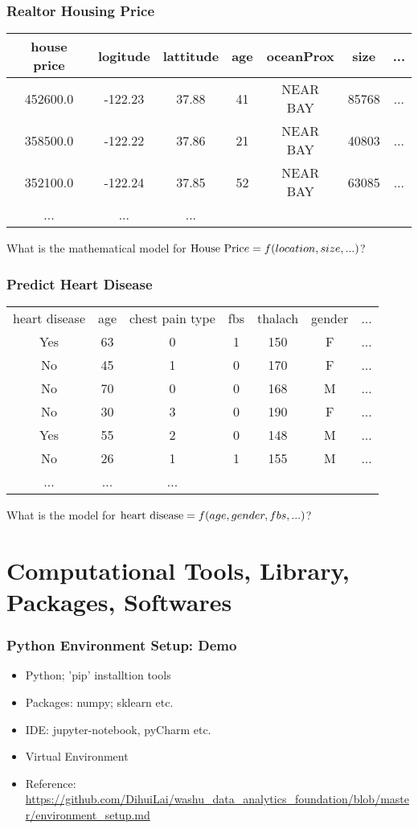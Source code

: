 \documentclass[notheorems, aspectratio=54]{beamer}
\begin{document}
\begin{frame}
\frametitle{Realtor Housing Price}
\begin{table}[]
\begin{tabular} { c c c c c c c}
house price &logitude & lattitude & age  &oceanProx &size &...\\ 
\hline
452600.0 &-122.23	&37.88	&41 	&NEAR BAY &85768 &...\\
358500.0 &-122.22	&37.86	&21		&NEAR BAY &40803 & ...\\
352100.0 &-122.24	&37.85	&52 	&NEAR BAY &63085 & ...\\
... & ... & ... & & & &
\end{tabular}
\end{table}

What is the mathematical model for $\text{House Pric}e=\mathnormal{f}(location, size,  ...)$?

\end{frame}

\begin{frame}
\frametitle{Predict Heart Disease}
\begin{table}[]
\begin{tabular} {c c c c c c c}
heart disease &age 	& chest pain type 	& fbs &thalach &gender &...\\ 
Yes		&63 	& 0 				&1 				&150		& F		&...\\
No 		&45 	& 1 				&0 				&170		&F		& ...\\
No 		&70 	& 0  				& 0  			&168		&M		& ...\\
No 		&30 	& 3 				&0 				&190		&F		& ...\\
Yes 	&55 	& 2 				& 0 			&148		&M		&...\\
No 		&26 	& 1 				& 1				&155	&M		&...\\
... & ... & ... & & & &
\end{tabular}
\end{table}
What is the model for $\text{heart disease}=\mathnormal{f}(age, gender, fbs,  ...)$?
\end{frame}


\section{Computational Tools, Library, Packages, Softwares}
\begin{frame}
\frametitle{Python Environment Setup: Demo}
\begin{itemize}
\item Python; 'pip' installtion tools
\item Packages: numpy; sklearn etc.
\item IDE: jupyter-notebook, pyCharm etc.
\item Virtual Environment
\item Reference: \url{https://github.com/DihuiLai/washu_data_analytics_foundation/blob/master/environment_setup.md}

\end{itemize}
\end{frame}
\end{document}
